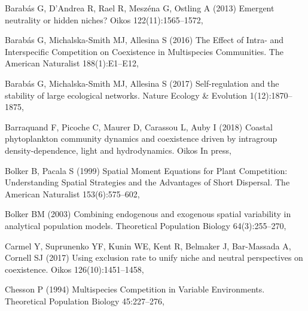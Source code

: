 \documentclass[smallcondensed,referee]{svjour3}       %
\begin{document}
\begin{thebibliography}{56}
Barab\'as G, D'Andrea R, Rael R, Mesz\'ena G, Ostling A (2013) Emergent
  neutrality or hidden niches? Oikos 122(11):1565--1572,

Barab\'as G, Michalska-Smith MJ, Allesina S (2016) The {Effect} of {Intra}- and
  {Interspecific} {Competition} on {Coexistence} in {Multispecies}
  {Communities}. The American Naturalist 188(1):E1--E12, 

Barab\'as G, Michalska-Smith MJ, Allesina S (2017) Self-regulation and the
  stability of large ecological networks. Nature Ecology \& Evolution
  1(12):1870--1875, 

Barraquand F, Picoche C, Maurer D, Carassou L, Auby I (2018) Coastal
  phytoplankton community dynamics and coexistence driven by intragroup
  density-dependence, light and hydrodynamics. Oikos In press,

Bolker B, Pacala S (1999) Spatial {Moment} {Equations} for {Plant}
  {Competition}: {Understanding} {Spatial} {Strategies} and the {Advantages} of
  {Short} {Dispersal}. The American Naturalist 153(6):575--602,

Bolker BM (2003) Combining endogenous and exogenous spatial variability in
  analytical population models. Theoretical Population Biology 64(3):255--270,

Carmel Y, Suprunenko YF, Kunin WE, Kent R, Belmaker J, Bar-Massada A, Cornell
  SJ (2017) Using exclusion rate to unify niche and neutral perspectives on
  coexistence. Oikos 126(10):1451--1458, 

Chesson P (1994) Multispecies {Competition} in {Variable} {Environments}.
  Theoretical Population Biology 45:227--276, 


\end{thebibliography}
\end{document}
